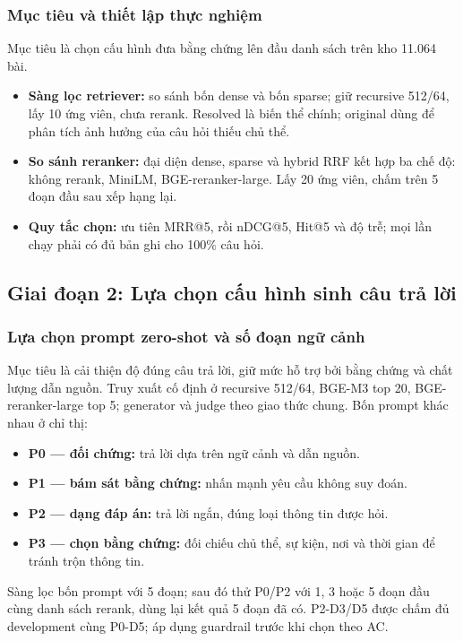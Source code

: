 \subsubsection{Mục tiêu và thiết lập thực nghiệm}
Mục tiêu là chọn cấu hình đưa bằng chứng lên đầu danh sách trên kho 11.064 bài.
\begin{itemize}
\item \textbf{Sàng lọc retriever:} so sánh bốn dense và bốn sparse; giữ recursive 512/64, lấy 10 ứng viên, chưa rerank. Resolved là biến thể chính; original dùng để phân tích ảnh hưởng của câu hỏi thiếu chủ thể.
\item \textbf{So sánh reranker:} đại diện dense, sparse và hybrid RRF kết hợp ba chế độ: không rerank, MiniLM, BGE-reranker-large. Lấy 20 ứng viên, chấm trên 5 đoạn đầu sau xếp hạng lại.
\item \textbf{Quy tắc chọn:} ưu tiên MRR@5, rồi nDCG@5, Hit@5 và độ trễ; mọi lần chạy phải có đủ bản ghi cho 100\% câu hỏi.
\end{itemize}



\subsection{Giai đoạn 2: Lựa chọn cấu hình sinh câu trả lời}
\subsubsection{Lựa chọn prompt zero-shot và số đoạn ngữ cảnh}
Mục tiêu là cải thiện độ đúng câu trả lời, giữ mức hỗ trợ bởi bằng chứng và chất lượng dẫn nguồn. Truy xuất cố định ở recursive 512/64, BGE-M3 top 20, BGE-reranker-large top 5; generator và judge theo giao thức chung. Bốn prompt khác nhau ở chỉ thị:
\begin{itemize}
\item \textbf{P0 — đối chứng:} trả lời dựa trên ngữ cảnh và dẫn nguồn.
\item \textbf{P1 — bám sát bằng chứng:} nhấn mạnh yêu cầu không suy đoán.
\item \textbf{P2 — dạng đáp án:} trả lời ngắn, đúng loại thông tin được hỏi.
\item \textbf{P3 — chọn bằng chứng:} đối chiếu chủ thể, sự kiện, nơi và thời gian để tránh trộn thông tin.
\end{itemize}

Sàng lọc bốn prompt với 5 đoạn; sau đó thử P0/P2 với 1, 3 hoặc 5 đoạn đầu cùng danh sách rerank, dùng lại kết quả 5 đoạn đã có. P2-D3/D5 được chấm đủ development cùng P0-D5; áp dụng guardrail trước khi chọn theo AC.



